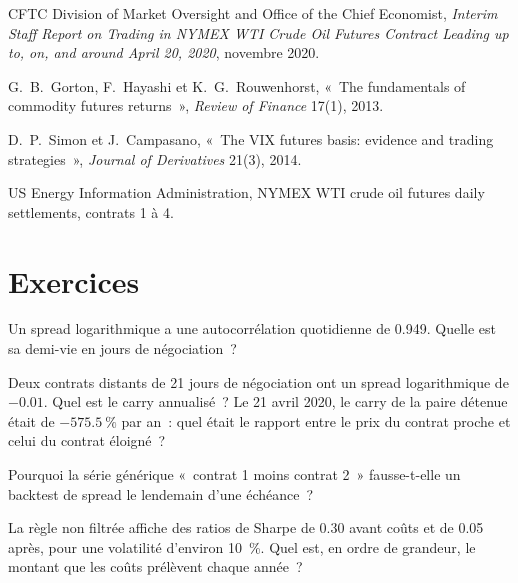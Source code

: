 \begin{omsources}
\item CFTC Division of Market Oversight and Office of the Chief Economist, \emph{Interim Staff Report on Trading in NYMEX WTI Crude Oil Futures Contract
Leading up to, on, and around April 20, 2020}, novembre 2020.
\item G.~B.~Gorton, F.~Hayashi et K.~G.~Rouwenhorst, «~The fundamentals of commodity futures returns~», \emph{Review of Finance} 17(1), 2013.
\item D.~P.~Simon et J.~Campasano, «~The VIX futures basis: evidence and trading strategies~», \emph{Journal of Derivatives} 21(3), 2014.
\item US Energy Information Administration, NYMEX WTI crude oil futures daily settlements, contrats 1 à 4.
\end{omsources}

\section{Exercices}

\begin{exercise}[$\star$]\label{exo:s1:calendar-spreads-and-curve-trades:1}
Un spread logarithmique a une autocorrélation quotidienne de 0.949. Quelle est sa demi-vie en jours de négociation~?
\end{exercise}

\begin{exercise}[$\star$]\label{exo:s1:calendar-spreads-and-curve-trades:2}
Deux contrats distants de 21 jours de négociation ont un spread logarithmique de $-0.01$. Quel est le carry annualisé~? Le 21 avril 2020, le carry de la paire détenue était de $-575.5~\%$ par
an~: quel était le rapport entre le prix du contrat proche et celui du contrat éloigné~?
\end{exercise}

\begin{exercise}[$\star$]\label{exo:s1:calendar-spreads-and-curve-trades:3}
Pourquoi la série générique «~contrat 1 moins contrat 2~» fausse-t-elle un backtest de spread le lendemain d'une échéance~?
\end{exercise}

\begin{exercise}[$\star\star$]\label{exo:s1:calendar-spreads-and-curve-trades:4}
La règle non filtrée affiche des ratios de Sharpe de 0.30 avant coûts et de 0.05 après, pour une volatilité d'environ 10~\%. Quel est, en ordre de grandeur, le montant que les coûts prélèvent chaque année~?
\end{exercise}

